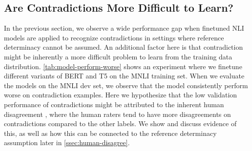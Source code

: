 \subsection{Are Contradictions More Difficult to Learn?}
In the previous section, we observe a wide performance gap when finetuned NLI models are applied to recognize contradictions in settings where reference determinacy cannot be assumed. An additional factor here is that contradiction might be inherently a more difficult problem to learn from the training data distribution. \autoref{tab:model-perform-worse} shows an experiment where we finetune different variants of BERT \cite{devlin-etal-2019-bert} and T5 on the MNLI training set. When we evaluate the models on the MNLI dev set, we observe that the model consistently perform worse on contradiction examples. 
Here we hypothesize that the low validation performance of contradictions might be attributed to the inherent human disagreement \cite{pavlick-kwiatkowski-2019-inherent}, where the human raters tend to have more disagreements on contradictions compared to the other labels. We show and discuss evidence of this, as well as how this can be connected to the reference determinacy assumption later in \cref{ssec:human-disagree}.   


